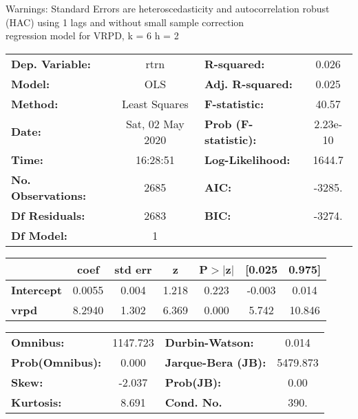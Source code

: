 Warnings: \newline
 [1] Standard Errors are heteroscedasticity and autocorrelation robust (HAC) using 1 lags and without small sample correction\\ 

regression model for VRPD, k = 6 h = 2\begin{center}
\begin{tabular}{lclc}
\toprule
\textbf{Dep. Variable:}    &       rtrn       & \textbf{  R-squared:         } &     0.026   \\
\textbf{Model:}            &       OLS        & \textbf{  Adj. R-squared:    } &     0.025   \\
\textbf{Method:}           &  Least Squares   & \textbf{  F-statistic:       } &     40.57   \\
\textbf{Date:}             & Sat, 02 May 2020 & \textbf{  Prob (F-statistic):} &  2.23e-10   \\
\textbf{Time:}             &     16:28:51     & \textbf{  Log-Likelihood:    } &    1644.7   \\
\textbf{No. Observations:} &        2685      & \textbf{  AIC:               } &    -3285.   \\
\textbf{Df Residuals:}     &        2683      & \textbf{  BIC:               } &    -3274.   \\
\textbf{Df Model:}         &           1      & \textbf{                     } &             \\
\bottomrule
\end{tabular}
\begin{tabular}{lcccccc}
                   & \textbf{coef} & \textbf{std err} & \textbf{z} & \textbf{P$> |$z$|$} & \textbf{[0.025} & \textbf{0.975]}  \\
\midrule
\textbf{Intercept} &       0.0055  &        0.004     &     1.218  &         0.223        &       -0.003    &        0.014     \\
\textbf{vrpd}      &       8.2940  &        1.302     &     6.369  &         0.000        &        5.742    &       10.846     \\
\bottomrule
\end{tabular}
\begin{tabular}{lclc}
\textbf{Omnibus:}       & 1147.723 & \textbf{  Durbin-Watson:     } &    0.014  \\
\textbf{Prob(Omnibus):} &   0.000  & \textbf{  Jarque-Bera (JB):  } & 5479.873  \\
\textbf{Skew:}          &  -2.037  & \textbf{  Prob(JB):          } &     0.00  \\
\textbf{Kurtosis:}      &   8.691  & \textbf{  Cond. No.          } &     390.  \\
\bottomrule
\end{tabular}
\end{center}

